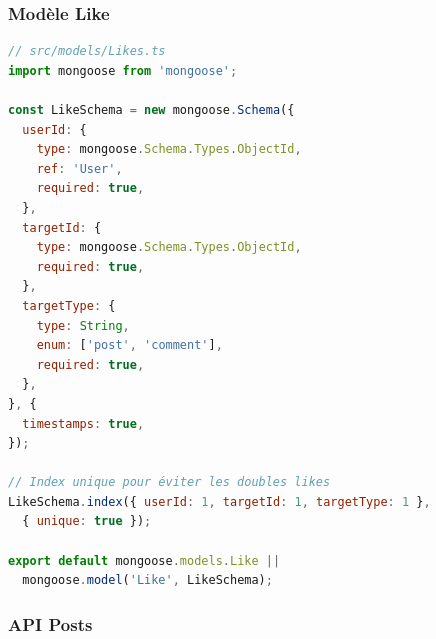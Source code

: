 \subsubsection{Modèle Like}

\begin{lstlisting}[language=JavaScript, caption=Schéma Mongoose Like, label=code:like-schema]
// src/models/Likes.ts
import mongoose from 'mongoose';

const LikeSchema = new mongoose.Schema({
  userId: {
    type: mongoose.Schema.Types.ObjectId,
    ref: 'User',
    required: true,
  },
  targetId: {
    type: mongoose.Schema.Types.ObjectId,
    required: true,
  },
  targetType: {
    type: String,
    enum: ['post', 'comment'],
    required: true,
  },
}, {
  timestamps: true,
});

// Index unique pour éviter les doubles likes
LikeSchema.index({ userId: 1, targetId: 1, targetType: 1 }, 
  { unique: true });

export default mongoose.models.Like || 
  mongoose.model('Like', LikeSchema);
\end{lstlisting}

\subsubsection{API Posts}

